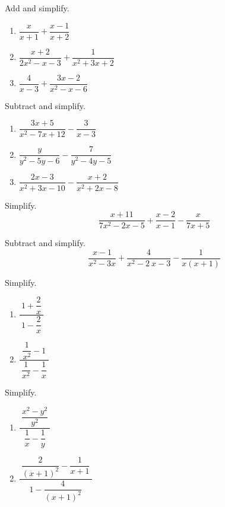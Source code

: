 \documentclass[en,12pt]{elegantbook}
\providecommand{\tightlist}{%
  \setlength{\itemsep}{0pt}\setlength{\parskip}{0pt}}
\let\BeginKnitrBlock\begin \let\EndKnitrBlock\end
\begin{document}
\BeginKnitrBlock{exercise}
\protect\hypertarget{exr:unnamed-chunk-72}{}{\label{exr:unnamed-chunk-72} }
Add and simplify.

\begin{enumerate}
\def\labelenumi{\arabic{enumi}.}
\tightlist
\item
  \(\dfrac{x}{x+1}+\dfrac{x-1}{x+2}\)
\item
  \(\dfrac{x+2}{2x^2-x-3}+\dfrac{1}{x^2+3x+2}\)
\item
  \(\dfrac{4}{x-3}+\dfrac{3x-2}{x^2-x-6}\)
\end{enumerate}
\EndKnitrBlock{exercise}

\BeginKnitrBlock{exercise}
\protect\hypertarget{exr:unnamed-chunk-73}{}{\label{exr:unnamed-chunk-73} }
Subtract and simplify.

\begin{enumerate}
\def\labelenumi{\arabic{enumi}.}
\tightlist
\item
  \(\dfrac{3x+5}{x^2-7x+12}-\dfrac{3}{x-3}\)
\item
  \(\dfrac{y}{y^2-5y-6}-\dfrac{7}{y^2-4y-5}\)
\item
  \(\dfrac{2x-3}{x^2+3x-10}-\dfrac{x+2}{x^2+2x-8}\)
\end{enumerate}
\EndKnitrBlock{exercise}

\BeginKnitrBlock{exercise}
\protect\hypertarget{exr:unnamed-chunk-74}{}{\label{exr:unnamed-chunk-74} }
Simplify.
\[
\frac{x+11}{7x^2-2x-5}+\frac{x-2}{x-1}-\frac{x}{7x+5}
\]
\EndKnitrBlock{exercise}

\BeginKnitrBlock{exercise}
\protect\hypertarget{exr:unnamed-chunk-75}{}{\label{exr:unnamed-chunk-75} }
Subtract and simplify.
\[
\frac{x-1}{x^2-3x}+\frac{4}{x^2-2\:x-3}-\frac{1}{x\left(x+1\right)}
\]
\EndKnitrBlock{exercise}

\BeginKnitrBlock{exercise}
\protect\hypertarget{exr:unnamed-chunk-76}{}{\label{exr:unnamed-chunk-76} }
Simplify.

\begin{enumerate}
\def\labelenumi{\arabic{enumi}.}
\tightlist
\item
  \(\dfrac{~1+\dfrac{2}{x}~}{~1-\dfrac{2}{x}~}\)
\item
  \(\dfrac{~\dfrac{1}{x^2}-1~}{~\dfrac{1}{x^2}-\dfrac{1}{x}~}\)
\end{enumerate}
\EndKnitrBlock{exercise}

\BeginKnitrBlock{exercise}
\protect\hypertarget{exr:unnamed-chunk-77}{}{\label{exr:unnamed-chunk-77} }
Simplify.

\begin{enumerate}
\def\labelenumi{\arabic{enumi}.}
\tightlist
\item
  \(\dfrac{~\dfrac{x^2-y^2}{y^2}~}{~\dfrac1x-\dfrac{1}{y}~}\)
\item
  \(\dfrac{~\dfrac{2}{(x+1)^2}-\dfrac{1}{x+1}~}{~1-\dfrac{4}{(x+1)^2}~}\)
\end{enumerate}
\EndKnitrBlock{exercise}
\end{document}
